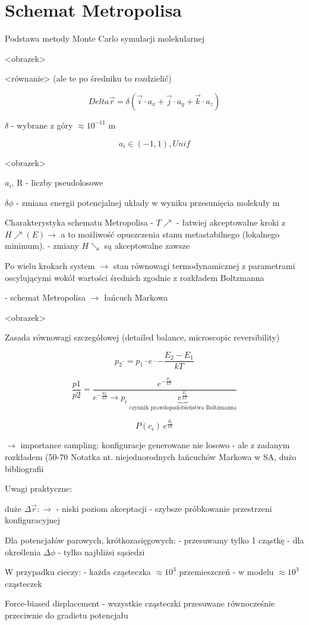 \section{Schemat Metropolisa}
Podstawa metody Monte Carlo symulacji molekularnej

<obrazek>

<równanie> (ale te po średniku to rozdzielić)

$$
Delta \vec{r} = \delta(\vec{i} \cdot a_x + \vec{j} \cdot a_y  + \vec{k} \cdot a_z)
$$

\begin{center}
$\delta$ - wybrane z góry $\approx 10^{-11}$ m
\end{center}

$$
a_i \in (-1, 1), Unif
$$

<obrazek>

$a_i$, R - liczby pseudolosowe

$\delta\phi$ - zmiana energii potencjalnej układy w wyniku przesunięcia molekuły m

Charakterystyka schematu Metropolisa
- $T \nearrow$ - łatwiej akceptowalne kroki z $H \nearrow (E) \rightarrow$ a to możliwość opuszczenia stanu metastabilnego (lokalnego minimum).
- zmiany $H \searrow$ są akceptowalne zawsze

Po wielu krokach system $\rightarrow$ stan równowagi termodynamicznej z parametrami oscylującymi wokół wartości średnich zgodnie z rozkładem Boltzmanna

- schemat Metropolisa $\rightarrow$ łańcuch Markowa

<obrazek>

Zasada równowagi szczegółowej (detailed balance, microscopic reversibility)

$$
p_2 \cdot = p_1 \cdot e \cdot - \dfrac{E_2 - E_1}{kT}
$$

$$
\frac{p1}{p2} = \dfrac{e^{-\frac{E_1}{kT}}}{e^{-\frac{E_2}{kT}} \rightarrow p_i ~ \underbrace{e^{\frac{E_i}{kT}}}_{\text{czynnik prawdopodobieństwa Boltzmanna}}}
$$

$$
P(c_i) ~ e^{\frac{E_i}{kT}}
$$

$\rightarrow$ importance sampling: konfiguracje generowane nie losowo - ale z zadanym rozkładem (50-70 %
Notatka nt. niejednorodnych łańcuchów Markowa w SA, dużo bibliografii


Uwagi praktyczne:

duże $\Delta\vec{r} : \rightarrow$
- niski poziom akceptacji
- szybsze próbkowanie przestrzeni konfiguracyjnej

Dla potencjałów parowych, krótkozasięgowych:
- przesuwamy tylko 1 cząstkę
- dla określenia $\Delta\phi$ - tylko najbliżsi sąsiedzi

W przypadku cieczy:
- każda cząsteczka $\approx 10^3$ przemieszczeń
- w modelu $\approx 10^3$ cząsteczek

Force-biased displacement
- wszystkie cząsteczki przesuwane równocześnie przeciwnie do gradietu potencjału
